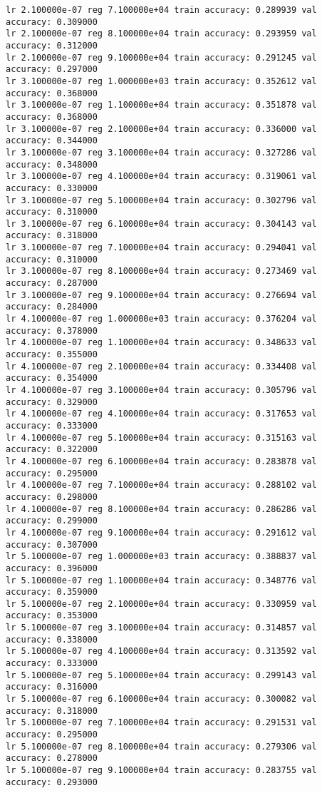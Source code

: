 \documentclass[11pt]{article}
\begin{document}
\begin{Verbatim}[commandchars=\\\{\}]
lr 2.100000e-07 reg 7.100000e+04 train accuracy: 0.289939 val accuracy: 0.309000
lr 2.100000e-07 reg 8.100000e+04 train accuracy: 0.293959 val accuracy: 0.312000
lr 2.100000e-07 reg 9.100000e+04 train accuracy: 0.291245 val accuracy: 0.297000
lr 3.100000e-07 reg 1.000000e+03 train accuracy: 0.352612 val accuracy: 0.368000
lr 3.100000e-07 reg 1.100000e+04 train accuracy: 0.351878 val accuracy: 0.368000
lr 3.100000e-07 reg 2.100000e+04 train accuracy: 0.336000 val accuracy: 0.344000
lr 3.100000e-07 reg 3.100000e+04 train accuracy: 0.327286 val accuracy: 0.348000
lr 3.100000e-07 reg 4.100000e+04 train accuracy: 0.319061 val accuracy: 0.330000
lr 3.100000e-07 reg 5.100000e+04 train accuracy: 0.302796 val accuracy: 0.310000
lr 3.100000e-07 reg 6.100000e+04 train accuracy: 0.304143 val accuracy: 0.318000
lr 3.100000e-07 reg 7.100000e+04 train accuracy: 0.294041 val accuracy: 0.310000
lr 3.100000e-07 reg 8.100000e+04 train accuracy: 0.273469 val accuracy: 0.287000
lr 3.100000e-07 reg 9.100000e+04 train accuracy: 0.276694 val accuracy: 0.284000
lr 4.100000e-07 reg 1.000000e+03 train accuracy: 0.376204 val accuracy: 0.378000
lr 4.100000e-07 reg 1.100000e+04 train accuracy: 0.348633 val accuracy: 0.355000
lr 4.100000e-07 reg 2.100000e+04 train accuracy: 0.334408 val accuracy: 0.354000
lr 4.100000e-07 reg 3.100000e+04 train accuracy: 0.305796 val accuracy: 0.329000
lr 4.100000e-07 reg 4.100000e+04 train accuracy: 0.317653 val accuracy: 0.333000
lr 4.100000e-07 reg 5.100000e+04 train accuracy: 0.315163 val accuracy: 0.322000
lr 4.100000e-07 reg 6.100000e+04 train accuracy: 0.283878 val accuracy: 0.295000
lr 4.100000e-07 reg 7.100000e+04 train accuracy: 0.288102 val accuracy: 0.298000
lr 4.100000e-07 reg 8.100000e+04 train accuracy: 0.286286 val accuracy: 0.299000
lr 4.100000e-07 reg 9.100000e+04 train accuracy: 0.291612 val accuracy: 0.307000
lr 5.100000e-07 reg 1.000000e+03 train accuracy: 0.388837 val accuracy: 0.396000
lr 5.100000e-07 reg 1.100000e+04 train accuracy: 0.348776 val accuracy: 0.359000
lr 5.100000e-07 reg 2.100000e+04 train accuracy: 0.330959 val accuracy: 0.353000
lr 5.100000e-07 reg 3.100000e+04 train accuracy: 0.314857 val accuracy: 0.338000
lr 5.100000e-07 reg 4.100000e+04 train accuracy: 0.313592 val accuracy: 0.333000
lr 5.100000e-07 reg 5.100000e+04 train accuracy: 0.299143 val accuracy: 0.316000
lr 5.100000e-07 reg 6.100000e+04 train accuracy: 0.300082 val accuracy: 0.318000
lr 5.100000e-07 reg 7.100000e+04 train accuracy: 0.291531 val accuracy: 0.295000
lr 5.100000e-07 reg 8.100000e+04 train accuracy: 0.279306 val accuracy: 0.278000
lr 5.100000e-07 reg 9.100000e+04 train accuracy: 0.283755 val accuracy: 0.293000

\end{Verbatim}
\end{document}
